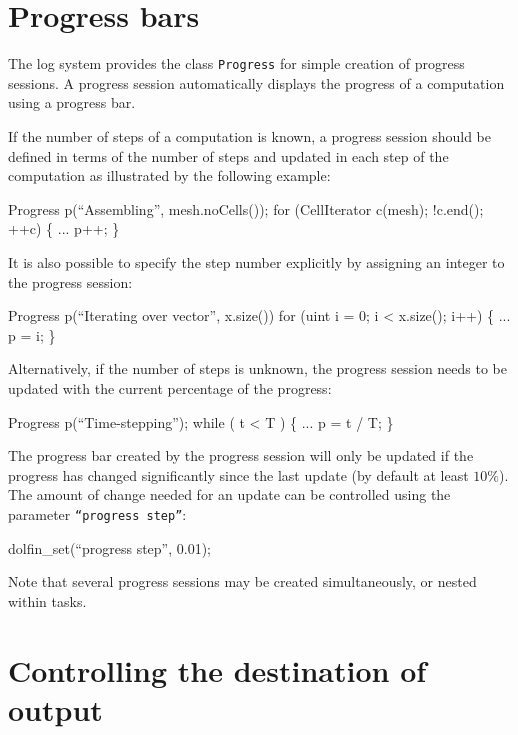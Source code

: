 \section{Progress bars}

The \dolfin{} log system provides the class \texttt{Progress} for
simple creation of progress sessions. A progress session automatically
displays the progress of a computation using a progress bar.

If the number of steps of a computation is known, a progress session
should  be defined in terms of the number of steps and updated in each
step of the computation as illustrated by the following example:
\begin{code}
  Progress p(``Assembling'', mesh.noCells());  
  for (CellIterator c(mesh); !c.end(); ++c)
  \{
    ...
    p++;
  \}
\end{code}
It is also possible to specify the step number explicitly by assigning
an integer to the progress session:
\begin{code}
  Progress p(``Iterating over vector'', x.size())
  for (uint i = 0; i < x.size(); i++)
  \{
    ...
    p = i;
  \}
\end{code}

Alternatively, if the number of steps is unknown, the progress session
needs to be updated with the current percentage of the progress:
\begin{code}
  Progress p(``Time-stepping'');
  while ( t < T )
  \{
    ...
    p = t / T;
  \}
\end{code}

The progress bar created by the progress session will only be updated
if the progress has changed significantly since the last update (by
default at least $10\%$). The
amount of change needed for an update can be controlled using the
parameter \texttt{``progress step''}:
\begin{code}
  dolfin_set(``progress step'', 0.01);
\end{code}

Note that several progress sessions may be created simultaneously, or
nested within tasks.

\section{Controlling the destination of output}

